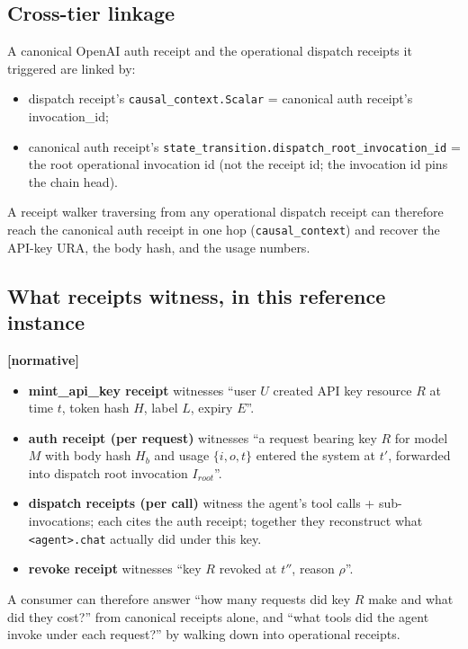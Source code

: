 \documentclass[11pt,a4paper]{article}
\newcommand{\normsv}{\textcolor{normativecolor}{\textbf{[normative]}}\xspace}
\theoremstyle{definition}
\begin{document}
\subsection{Cross-tier linkage}

A canonical OpenAI auth receipt and the operational dispatch
receipts it triggered are linked by:

\begin{itemize}[leftmargin=2em,itemsep=0.12em]
    \item dispatch receipt's \texttt{causal\_context.Scalar} = canonical auth receipt's invocation\_id;
    \item canonical auth receipt's \texttt{state\_transition.dispatch\_root\_invocation\_id} = the root operational invocation id (not the receipt id; the invocation id pins the chain head).
\end{itemize}

A receipt walker traversing from any operational dispatch
receipt can therefore reach the canonical auth receipt in one
hop (\texttt{causal\_context}) and recover the API-key URA, the
body hash, and the usage numbers.

\subsection{What receipts witness, in this reference instance}

\normsv{}

\begin{itemize}[leftmargin=2em,itemsep=0.18em]
    \item \textbf{mint\_api\_key receipt} witnesses ``user \(U\) created
    API key resource \(R\) at time \(t\), token hash \(H\),
    label \(L\), expiry \(E\)''.
    \item \textbf{auth receipt (per request)} witnesses ``a
    request bearing key \(R\) for model \(M\) with body hash
    \(H_b\) and usage \(\{i, o, t\}\) entered the system at
    \(t'\), forwarded into dispatch root invocation
    \(I_{root}\)''.
    \item \textbf{dispatch receipts (per call)} witness the
    agent's tool calls + sub-invocations; each cites the auth
    receipt; together they reconstruct what \texttt{<agent>.chat}
    actually did under this key.
    \item \textbf{revoke receipt} witnesses ``key \(R\) revoked
    at \(t''\), reason \(\rho\)''.
\end{itemize}

A consumer can therefore answer ``how many requests did key
\(R\) make and what did they cost?'' from canonical receipts
alone, and ``what tools did the agent invoke under each request?''
by walking down into operational receipts.
\end{document}
